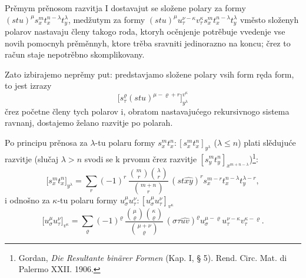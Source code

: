 \documentclass[11pt]{article}
\begin{document}
Prěmym prěnosom razvitja I dostavajut se složene polary za formy $(stu)^\mu s_x^m t_x^{n-\lambda}t_y^\lambda$, medžutym za formy $(stu)^\mu u_\tau^{\nu-\kappa}v_\tau^\kappa s_x^m t_x^{n-\lambda}t_y^\lambda$ vměsto složenyh polarov nastavaju členy takogo roda, ktoryh ocěnjenje potrěbuje vvedenje vse novih pomocnyh prěměnnyh, ktore trěba sravniti jedinorazno na koncu; črez to račun staje nepotrěbno skomplikovany.

Zato izbirajemo neprěmy put: predstavjamo složene polary vsih form ręda form, to jest izrazy
\[
\bigl[s_\tau^\varrho(stu)^{\mu-\varrho+r}\bigr]_{y^\lambda}^{v^\kappa}
\]
črez početne členy tych polarov i, obratom nastavajućego rekursivnogo sistema ravnanj, dostajemo želano razvitje po polarah.

Po principu prěnosa za $\lambda$-tu polaru formy $s_x^m t_x^n:[s_x^m t_x^n]_{y^\lambda}$ ($\lambda\le n$) plati slědujuće razvitje (slučaj $\lambda>n$ svodi se k prvomu črez razvitje $[s_y^m t_y^n]_{x^{m+n-\lambda}}$)\footnote{Gordan, \emph{Die Resultante binärer Formen} (Kap. I, § 5). Rend. Circ. Mat. di Palermo XXII. 1906.}:
\[
\bigl[s_x^m t_x^n\bigr]_{y^\lambda}
=\sum_r (-1)^r\,
\frac{\binom{m}{r}\binom{\lambda}{r}}{\binom{m+n}{r}}\,
(st\widehat{xy})^r s_x^{m-r}t_x^{n-\lambda}t_y^{\lambda-r},
\]
i odnošno za $\kappa$-tu polaru formy $u_\sigma^\mu u_\tau^\nu:[u_\sigma^\mu u_\tau^\nu]_{v^\kappa}$
\[
\bigl[u_\sigma^\mu u_\tau^\nu\bigr]_{v^\kappa}
=\sum_\varrho (-1)^\varrho\,
\frac{\binom{\mu}{\varrho}\binom{\kappa}{\varrho}}{\binom{\mu+\nu}{\varrho}}\,
(\sigma\tau\widehat{uv})^\varrho u_\sigma^{\mu-\varrho}u_\tau^{\nu-\kappa}v_\tau^{\kappa-\varrho}.
\]
\end{document}
